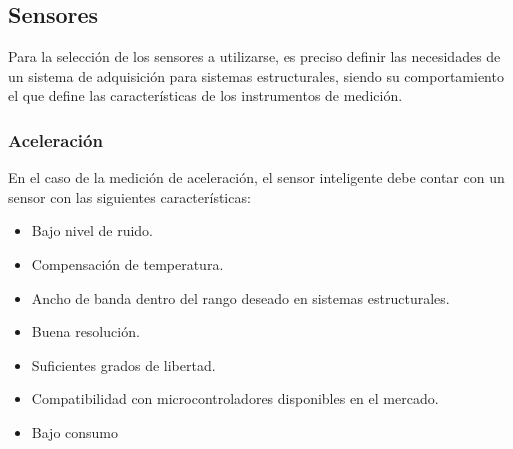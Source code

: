 \begin{table}[H]
    \centering
    \caption{Comparación entre módulos LoRa del fabricante Semtech \citep{datasheetSemtech}.}
    \label{tab:moduloslora}
    \end{table}

\subsection{Sensores}

Para la selección de los sensores a utilizarse, es preciso definir las necesidades de un sistema de adquisición para sistemas estructurales, siendo su comportamiento el que define las características de los instrumentos de medición.

\subsubsection{Aceleración} 

En el caso de la medición de aceleración, el sensor inteligente debe contar con un sensor con las siguientes características:

\begin{itemize}
    \item Bajo nivel de ruido.
    \item Compensación de temperatura.
    \item Ancho de banda dentro del rango deseado en sistemas estructurales.
    \item Buena resolución.
    \item Suficientes grados de libertad.
    \item Compatibilidad con microcontroladores disponibles en el mercado.
    \item Bajo consumo
\end{itemize}

